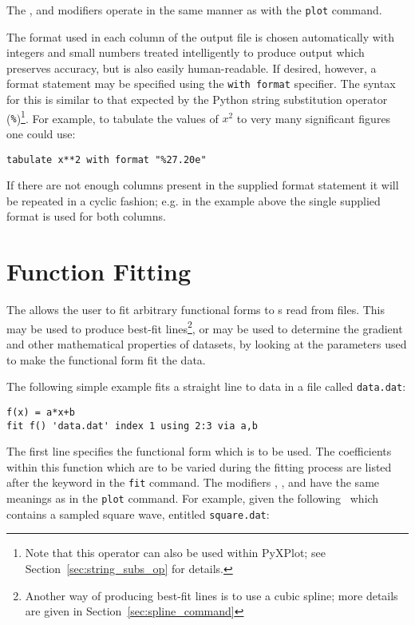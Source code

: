 \noindent The ,  and  modifiers
operate in the same manner as with the {\tt plot} command.

The format used in each column of the output file is chosen automatically with
integers and small numbers treated intelligently to produce output which
preserves accuracy, but is also easily human-readable. If desired, however, a
format statement may be specified using the {\tt with format} specifier. The
syntax for this is similar to that expected by the Python string substitution
operator ({\tt \%})\footnote{Note that this operator can also be used
within PyXPlot; see Section~\ref{sec:string_subs_op} for details.}.  For example,
to tabulate the values of $x^2$ to very many significant figures one could use:

\begin{verbatim}
tabulate x**2 with format "%27.20e"
\end{verbatim}

If there are not enough columns present in the supplied format statement it
will be repeated in a cyclic fashion; e.g. in the example above the single
supplied format is used for both columns.

\section{Function Fitting}
\label{sec:fit_command}

The  allows the user to fit arbitrary functional forms to
\datapoint s read from files.  This may be used to produce best-fit
lines\footnote{Another way of producing best-fit lines is
to use a cubic spline; more details are given in
Section~\ref{sec:spline_command}}, or may be used to determine the gradient and
other mathematical properties of datasets, by looking at the parameters used to
make the functional form fit the data.

The following simple example fits a straight line to data in
a file called {\tt data.dat}:

\begin{verbatim}
f(x) = a*x+b
fit f() 'data.dat' index 1 using 2:3 via a,b
\end{verbatim}

\noindent The first line specifies the functional form which is to be used.
The coefficients within this function which are to be varied during the fitting
process are listed after the keyword  in the {\tt fit} command.
The modifiers , ,  and
 have the same meanings as in the {\tt plot} command.  For example,
given the following \datafile\ which contains a sampled square wave, entitled
{\tt square.dat}:

